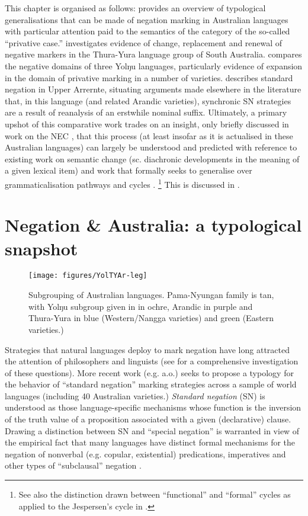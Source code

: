 \documentclass[output=paper]{langsci/langscibook}
\begin{document}
This chapter is organised as follows:  provides an
overview of typological generalisations that can be made of negation
marking in Australian languages with particular attention paid to the
semantics of the category of the so-called ``privative case.''
 investigates evidence of change, replacement and
renewal of negative markers in the Thura-Yura language group of South
Australia.  compares the negative domains of three
Yolŋu languages, particularly evidence of expansion in the domain of
privative marking in a number of varieties. 
describes standard negation in Upper Arrernte, situating arguments made
elsewhere in the literature \citep[particularly][]{Henderson2013} that,
in this language (and related Arandic varieties), synchronic SN
strategies are a result of reanalysis of an erstwhile nominal suffix.
Ultimately, a primary upshot of this comparative work trades on an
insight, only briefly discussed in work on the NEC
\parencite[e.g.][17]{Croft1991}, that this process (at least insofar as
it is actualised in these Australian languages) can largely be
understood and predicted with reference to existing work on semantic
change (sc. diachronic developments in the meaning of a given
lexical item) and work that formally seeks to generalise over
grammaticalisation pathways and cycles 
\parencites(e.g.)(){Deo2015}{Deo2015a}{Deo2018}.%
%
\footnote{See also the distinction drawn between ``functional'' and ``formal'' cycles as applied to the Jespersen's cycle in \citet{AhernClark2017}.} This is discussed in .

\section{Negation \& Australia: a typological snapshot}\label{sec:austr-2}
\begin{figure}%
	\texttt{[image: figures/YolTYAr-leg]}
	\caption{Subgrouping of Australian languages. Pama-Nyungan family is tan, with Yolŋu subgroup given in in ochre, Arandic in purple and Thura-Yura in blue (Western\slash Nangga varieties) and green (Eastern varieties.)}
\end{figure}\noindent

Strategies that natural languages deploy to mark negation have long attracted the attention of philosophers and linguists (see \citealt{Horn1989} for a comprehensive investigation of these questions). More recent work (e.g. \citealt{Miestamo2005} a.o.) seeks to propose a typology for the behavior of ``standard negation'' marking strategies across a sample of world languages (including 40 Australian varieties.) \textit{Standard negation} (SN) is understood as those language-specific mechanisms whose function is the inversion of the truth value of a proposition associated with a given (declarative) clause. Drawing a distinction between SN and ``special negation'' is warranted in view of the empirical fact that many languages have distinct formal mechanisms for the negation of nonverbal (e.g. copular, existential) predications, imperatives and other types of ``subclausal'' negation \citep{Miestamo2007,HornWansing2017,Veselinova2013,AuweraLejeune2005}.
\end{document}
